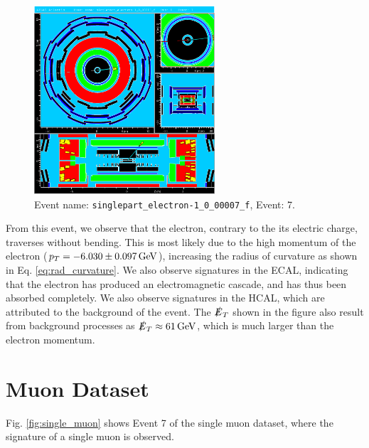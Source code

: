 \documentclass[a4paper]{report}
\numberwithin{equation}{section}
\begin{document}
\begin{figure}[htpb]
    \centering
    \includegraphics[width=0.6\textwidth]{electron_event7.eps}
    \caption{Event name: \texttt{singlepart\_electron-1\_0\_00007\_f}, Event: 7. }
    \label{fig:single_e}
\end{figure}

From this event, we observe that the electron, contrary to the its electric charge, traverses without bending. This is most likely
due to the high momentum of the electron ($p_T = \SI{-6.03 \pm 0.097}{\giga\electronvolt}$), increasing the radius of curvature as shown in Eq. \ref{eq:rad_curvature}. We also observe 
signatures in the ECAL, indicating that the electron has produced an electromagnetic cascade, and has thus been absorbed completely. 
We also observe signatures in the HCAL, which are attributed to the background of the event. The $\slashed{E}_T$ shown in the 
figure also result from background processes as $\slashed{E}_T \approx \SI{61}{\giga\electronvolt}$, which is much larger than the 
electron momentum. \par 

\section{Muon Dataset}

Fig. \ref{fig:single_muon} shows Event 7 of the single muon dataset, where the signature of a single muon is observed. 
\end{document}
